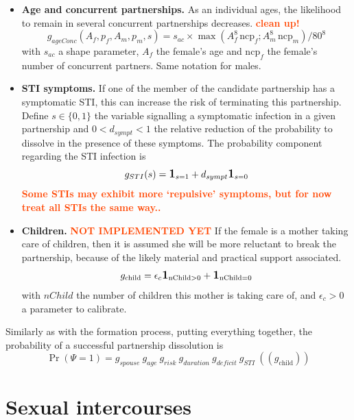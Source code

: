\documentclass[11pt, onecolumn]{article}
\newcommand{\one}[1]{\textbf{\large{1}}_{#1}}
\newcommand{\warning}[1]{\textbf{\textcolor{OrangeRed}{#1}}}
\begin{document}
\begin{itemize}
\item \textbf{Age and concurrent partnerships.} As an individual ages, the likelihood to remain in several concurrent partnerships decreases. \warning{clean up!}
$$g_{ageConc}(A_f,p_f,A_m,p_m,s) = s_{ac} \times \max\left( A_f^8 \, \mathrm{ncp}_f ; A_m^8 \, \mathrm{ncp}_m  \right)/80^8$$
with $s_{ac}$ a shape parameter, $A_f$ the female's age and $\mathrm{ncp}_f$ the female's number of concurrent partners. Same notation for males. 


\item \textbf{STI symptoms.}
If one of the member of the candidate partnership has a symptomatic STI, this can increase the risk of terminating this partnership.
Define $s\in\{0,1\}$ the variable signalling a symptomatic infection in a given partnership  and $0<d_{sympt}<1$ the relative reduction of the probability to dissolve in the presence of these symptoms.
The probability component regarding the STI infection is
$$ g_{STI}(s)= \one{s=1} +d_{sympt}\one{s=0}$$
\warning{Some STIs may exhibit more `repulsive' symptoms, but for now treat all STIs the same way..}

\item \textbf{Children.} \warning{NOT IMPLEMENTED YET}
If the female is a mother taking care of children, then it is assumed she will be more reluctant to break the partnership, because of the likely material and practical support associated.
$$g_{\mathrm{child}} = \epsilon_c \one{\mathrm{nChild>0}} +  \one{\mathrm{nChild=0}}$$
with $nChild$ the number of children this mother is taking care of, and $\epsilon_c>0$ a parameter to calibrate.

\end{itemize}

Similarly as with the formation process, putting everything together, the probability of a successful partnership dissolution is
\begin{equation}
\label{probaDissolution}
\Pr(\Psi=1) = g_{spouse}\ g_{age}\ g_{risk}\ g_{duration}\ g_{deficit}\ g_{STI}\ ((g_{\mathrm{child}}))
\end{equation}




\section{Sexual intercourses}
\end{document}
